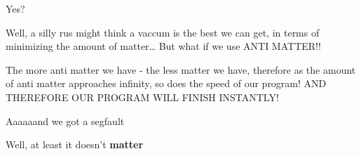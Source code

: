 \documentclass{article}
\begin{document}
\begin{sketch}
Yes?

Well, a silly rus might think a vaccum is the best we can get, in terms of minimizing the amount of matter… But what if we use ANTI MATTER!!

The more anti matter we have - the less matter we have, therefore as the amount of anti matter approaches infinity, so does the speed of our program! AND THEREFORE OUR PROGRAM WILL FINISH INSTANTLY!

Aaaaaand we got a segfault

Well, at least it doesn’t \textbf{matter}


\end{sketch}
\end{document}
